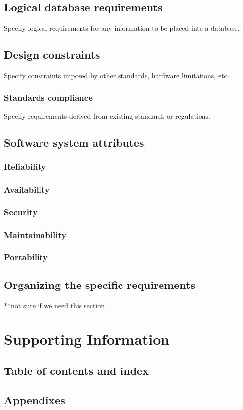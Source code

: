 \documentclass[letterpaper,10pt,draftclsnofoot,onecolumn,titlepage]{IEEEtran}
\begin{document}
	\subsection{Logical database requirements}
	Specify logical requirements for any information to be placed into a database.
	
	\subsection{Design constraints}
	Specify constraints imposed by other standards, hardware limitations, etc.
	
	\subsubsection{Standards compliance}
	Specify requirements derived from existing standards or regulations. 
	
	\subsection{Software system attributes}
	\subsubsection{Reliability}
	\subsubsection{Availability}
	\subsubsection{Security}
	\subsubsection{Maintainability}
	\subsubsection{Portability}
	
	\subsection{Organizing the specific requirements}
	**not sure if we need this section
	
	\section{Supporting Information}
	\subsection{Table of contents and index}
	\subsection{Appendixes}
 
\end{document}
